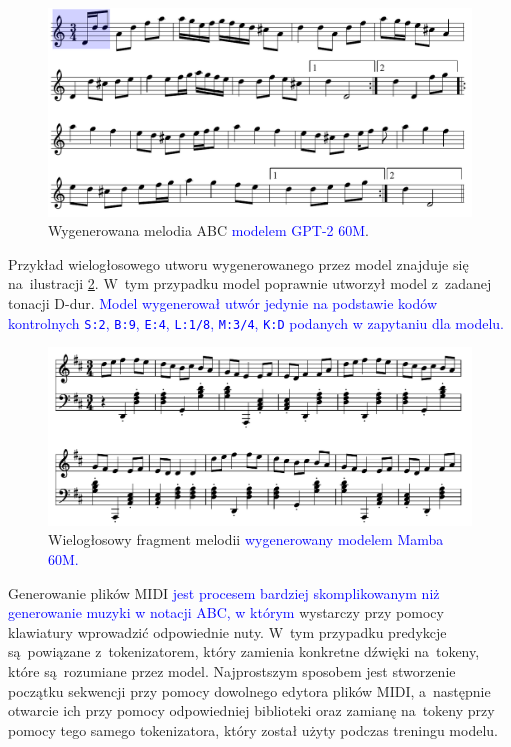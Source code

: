 \documentclass[data-science]{agh-wi} %
\begin{document}
\begin{figure}[ht!]
    \begin{center}
        \includegraphics[width=0.9\linewidth]{./img/abc_gen_nice1.pdf}
    \end{center}
    \caption{Wygenerowana melodia ABC \textcolor{blue}{modelem GPT-2 60M}.}\label{fig:music_gen1}
\end{figure}

Przykład wielogłosowego utworu wygenerowanego przez model znajduje się na~ilustracji \ref*{fig:vvv_abc}. W~tym przypadku model poprawnie utworzył model z~zadanej tonacji D-dur. \textcolor{blue}{Model wygenerował utwór jedynie na podstawie kodów kontrolnych \texttt{S:2}, \texttt{B:9}, \texttt{E:4}, \texttt{L:1/8}, \texttt{M:3/4}, \texttt{K:D} podanych w zapytaniu dla modelu.}

\begin{figure}[ht!]
    \centering
    \includegraphics[width=0.9\linewidth]{./img/example.pdf}
    \caption{Wielogłosowy fragment melodii \textcolor{blue}{wygenerowany modelem Mamba 60M.}}\label{fig:vvv_abc}
\end{figure}

Generowanie plików MIDI \textcolor{blue}{jest procesem bardziej skomplikowanym niż generowanie muzyki w notacji ABC, w którym }wystarczy przy pomocy klawiatury wprowadzić odpowiednie nuty. W~tym przypadku predykcje są~powiązane z~tokenizatorem, który zamienia konkretne dźwięki na~tokeny, które są~rozumiane przez model. Najprostszym sposobem jest stworzenie początku sekwencji przy pomocy dowolnego edytora plików MIDI, a~następnie otwarcie ich przy pomocy odpowiedniej biblioteki oraz zamianę na~tokeny przy pomocy tego samego tokenizatora, który został użyty podczas treningu modelu.
\end{document}
